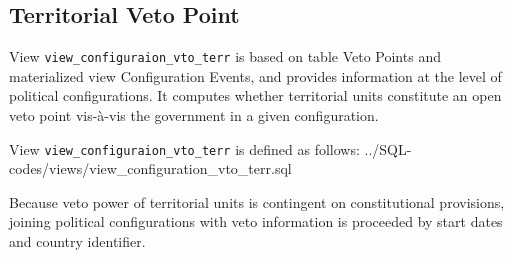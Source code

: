 \subsection{Territorial Veto Point}\label{view_configuration_vto_terr}

View \texttt{view\_configuraion\_vto\_terr} is based on table Veto Points and materialized view Configuration Events, and provides information at the level of political configurations.
It computes whether territorial units constitute an open veto point vis-\`{a}-vis the government in a given configuration.

View \texttt{view\_configuraion\_vto\_terr} is defined as follows:
%
{../SQL-codes/views/view_configuration_vto_terr.sql}

Because veto power of territorial units is contingent on constitutional provisions,
joining political configurations with veto information is proceeded by start dates and country identifier. 


